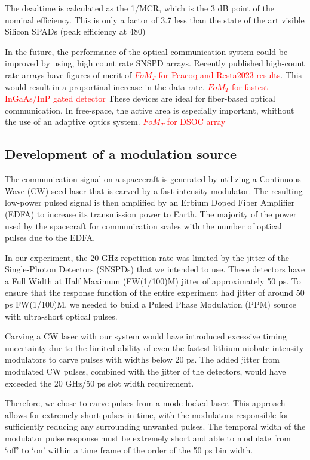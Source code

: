 \documentclass{optica-article}
\begin{document}
The deadtime is calculated as the 1/MCR, which is the 3 dB point of the nominal efficiency. This is only a factor of 3.7 less than the state of the art visible Silicon SPADs (peak efficiency at 480\nm) \cite{Gramuglia2022}

In the future, the performance of the optical communication system could be improved by using, high count rate SNSPD arrays. Recently published high-count rate arrays have figures of merit of \textcolor{red}{\(FoM_T\) for Peacoq and Resta2023 results}. This would result in a proportinal increase in the data rate.
\textcolor{red}{\(FoM_T\) for fastest InGaAs/InP gated detector}
These devices are ideal for fiber-based optical communication. In free-space, the active area is especially important, whithout the use of an adaptive optics system.
\textcolor{red}{\(FoM_T\) for DSOC array}

\hypertarget{development-of-a-modulation-source}{%
\subsection{Development of a modulation source}\label{development-of-a-modulation-source}}

The communication signal on a spacecraft is generated by utilizing a Continuous Wave (CW) seed laser that is carved by a fast intensity modulator. The resulting low-power pulsed signal is then amplified by an Erbium Doped Fiber Amplifier (EDFA) to increase its transmission power to Earth. The majority of the power used by the spacecraft for communication scales with the number of optical pulses due to the EDFA.

In our experiment, the 20 GHz repetition rate was limited by the jitter of the Single-Photon Detectors (SNSPDs) that we intended to use. These detectors have a Full Width at Half Maximum (FW(1/100)M) jitter of approximately 50 ps. To ensure that the response function of the entire experiment had jitter of around 50 ps FW(1/100)M, we needed to build a Pulsed Phase Modulation (PPM) source with ultra-short optical pulses.

Carving a CW laser with our system would have introduced excessive timing uncertainty due to the limited ability of even the fastest lithium niobate intensity modulators to carve pulses with widths below 20 ps. The added jitter from modulated CW pulses, combined with the jitter of the detectors, would have exceeded the 20 GHz/50 ps slot width requirement.

Therefore, we chose to carve pulses from a mode-locked laser. This approach allows for extremely short pulses in time, with the modulators responsible for sufficiently reducing any surrounding unwanted pulses. The temporal width of the modulator pulse response must be extremely short and able to modulate from `off' to `on' within a time frame of the order of the 50 ps bin width.
\end{document}

